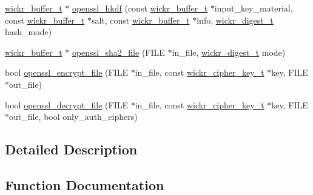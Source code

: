 \begin{DoxyCompactItemize}
\item 
\mbox{\hyperlink{structwickr__buffer}{wickr\+\_\+buffer\+\_\+t}} $\ast$ \mbox{\hyperlink{group__openssl__crypto_ga788a03002d8c6048401cf0bbc2d48c7a}{openssl\+\_\+hkdf}} (const \mbox{\hyperlink{structwickr__buffer}{wickr\+\_\+buffer\+\_\+t}} $\ast$input\+\_\+key\+\_\+material, const \mbox{\hyperlink{structwickr__buffer}{wickr\+\_\+buffer\+\_\+t}} $\ast$salt, const \mbox{\hyperlink{structwickr__buffer}{wickr\+\_\+buffer\+\_\+t}} $\ast$info, \mbox{\hyperlink{structwickr__digest}{wickr\+\_\+digest\+\_\+t}} hash\+\_\+mode)
\item 
\mbox{\hyperlink{structwickr__buffer}{wickr\+\_\+buffer\+\_\+t}} $\ast$ \mbox{\hyperlink{group__openssl__crypto_ga12da75115315fbf7394f4791a2eb815c}{openssl\+\_\+sha2\+\_\+file}} (F\+I\+LE $\ast$in\+\_\+file, \mbox{\hyperlink{structwickr__digest}{wickr\+\_\+digest\+\_\+t}} mode)
\item 
bool \mbox{\hyperlink{group__openssl__crypto_ga178fa1f33ad2767c27411c3ebcdd3ca0}{openssl\+\_\+encrypt\+\_\+file}} (F\+I\+LE $\ast$in\+\_\+file, const \mbox{\hyperlink{structwickr__cipher__key}{wickr\+\_\+cipher\+\_\+key\+\_\+t}} $\ast$key, F\+I\+LE $\ast$out\+\_\+file)
\item 
bool \mbox{\hyperlink{group__openssl__crypto_gaf1faa509e06c188acfbdf43e2197c61a}{openssl\+\_\+decrypt\+\_\+file}} (F\+I\+LE $\ast$in\+\_\+file, const \mbox{\hyperlink{structwickr__cipher__key}{wickr\+\_\+cipher\+\_\+key\+\_\+t}} $\ast$key, F\+I\+LE $\ast$out\+\_\+file, bool only\+\_\+auth\+\_\+ciphers)
\end{DoxyCompactItemize}


\subsection{Detailed Description}


\subsection{Function Documentation}
\mbox{\label{group__openssl__crypto_ga75eaf118b28fb76e75579d0a74517b18}} 

